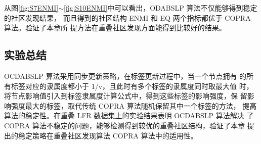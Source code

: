 从图\ref{fig:S7ENMI}$\sim$\ref{fig:S10ENMI}中可以看出，ODABSLP 算法不仅能够得到稳定的社区发现结果，
而且得到的社区结构 ENMI 和 EQ 两个指标都优于 COPRA 算法。验证了本章所
提方法在重叠社区发现方面能得到比较好的结果。

\subsection{实验总结}

OCDABSLP 算法采用同步更新策略，在标签更新过程中，当一个节点拥有
的所有标签对应的隶属度都小于 1/v，且此时有多个标签的隶属度同时取最大值
时，将节点影响值引入到标签隶属度计算公式中，得到这些标签的影响强度，保
留影响强度最大的标签，取代传统 COPRA 算法随机保留其中一个标签的方法，
提高算法的稳定性。在重叠 LFR 数据集上的实验结果表明 OCDABSLP 算法解决
了 COPRA 算法不稳定的问题，能够检测得到较优的重叠社区结构，验证了本章
提出的稳定策略在重叠社区发现算法 COPRA 算法中的适用性。
